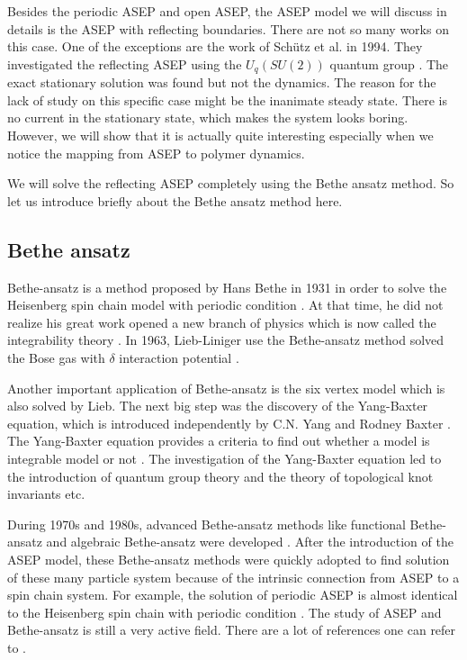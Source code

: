 Besides the periodic ASEP and open ASEP, the ASEP model we will discuss in details is the ASEP with reflecting boundaries. There are not so many works on this case. One of the exceptions are the work of Sch\"{u}tz et al. in 1994. They investigated the reflecting ASEP using the $U_q(SU(2))$ quantum group \cite{Sandow1994}. The exact stationary solution was found but not the dynamics. The reason for the lack of study on this specific case might be the inanimate steady state. There is no current in the stationary state, which makes the system looks boring. However, we will show that it is actually quite interesting especially when we notice the mapping from ASEP to polymer dynamics.

We will solve the reflecting ASEP completely using the Bethe ansatz method. So let us introduce briefly about the Bethe ansatz method here.

\subsection{Bethe ansatz}
\label{sub:bethe_ansatz}

Bethe-ansatz is a method proposed by Hans Bethe in 1931 in order to solve the Heisenberg spin chain model with periodic condition \cite{Bethe1931}. At that time, he did not realize his great work opened a new branch of physics which is now called the integrability theory \cite{Batchelor2007}. In 1963, Lieb-Liniger use the Bethe-ansatz method solved the Bose gas with $\delta$ interaction potential \cite{Lieb1963a,Lieb1963}. 

Another important application of Bethe-ansatz is the six vertex model which is also solved by Lieb. The next big step was the discovery of the Yang-Baxter equation, which is introduced independently by C.N. Yang and Rodney Baxter \cite{Yang1967,Baxter1972}. The Yang-Baxter equation provides a criteria to find out whether a model is integrable model or not \cite{Batchelor2007}. The investigation of the Yang-Baxter equation led to the introduction of quantum group theory and the theory of topological knot invariants etc. 

During 1970s and 1980s, advanced Bethe-ansatz methods like functional Bethe-ansatz  and algebraic Bethe-ansatz were developed \cite{Mallick2011b}. After the introduction of the ASEP model, these Bethe-ansatz methods were quickly adopted to find solution of these many particle system because of the intrinsic connection from ASEP to a spin chain system. For example, the solution of periodic ASEP is almost identical to the Heisenberg spin chain with periodic condition \cite{Mallick2011b}. The study of ASEP and Bethe-ansatz is still a very active field. There are a lot of references one can refer to \cite{Derrida1998,Liggett1999,Schutz2001,Golinelli2006,Mallick2011b}. 

